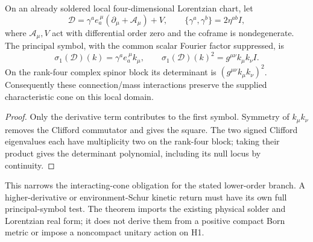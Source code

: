 \documentclass[12pt,a4paper]{article}
\begin{document}
\begin{theorem}
\label{p2d:thm:v2210-lit-lower-order-cone}
On an already soldered local four-dimensional Lorentzian chart, let
\[
 \mathscr D=\gamma^ae_a^{\ \mu}(\partial_\mu+\mathcal A_\mu)+V,
 \qquad \{\gamma^a,\gamma^b\}=2\eta^{ab}I,
\]
where $\mathcal A_\mu,V$ act with differential order zero and the coframe
is nondegenerate.  The principal symbol, with the common scalar Fourier
factor suppressed, is
\[
 \sigma_1(\mathscr D)(k)=\gamma^ae_a^{\ \mu}k_\mu,
 \qquad \sigma_1(\mathscr D)(k)^2
 =g^{\mu\nu}k_\mu k_\nu I.
\]
On the rank-four complex spinor block its determinant is
$(g^{\mu\nu}k_\mu k_\nu)^2$.  Consequently these connection/mass
interactions preserve the supplied characteristic cone on this local domain.
\end{theorem}
\begin{proof}
Only the derivative term contributes to the first symbol.  Symmetry of
$k_\mu k_\nu$ removes the Clifford commutator and gives the square.
The two signed Clifford eigenvalues each have multiplicity two on the
rank-four block; taking their product gives the determinant polynomial,
including its null locus by continuity.
\end{proof}
This narrows the interacting-cone obligation for the stated lower-order
branch.  A higher-derivative or environment-Schur kinetic return must have
its own full principal-symbol test.  The theorem imports the existing
physical solder and Lorentzian real form; it does not derive them from a
positive compact Born metric or impose a noncompact unitary action on H1.
\end{document}
